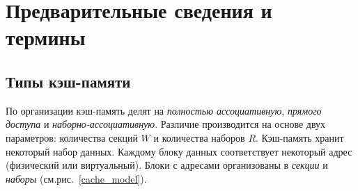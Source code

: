 %



\section{Предварительные сведения и термины}


\subsection{Типы кэш-памяти}

По организации кэш-память делят на \emph{полностью ассоциативную},
\emph{прямого доступа} и \emph{наборно-ассоциативную}. Различие
производится на основе двух параметров: количества секций $W$ и
количества наборов $R$. Кэш-память хранит некоторый набор данных.
Каждому блоку данных соответствует некоторый адрес (физический или
виртуальный). Блоки с адресами организованы в \emph{секции} и
\emph{наборы} (см.рис.~\ref{cache_model}).

